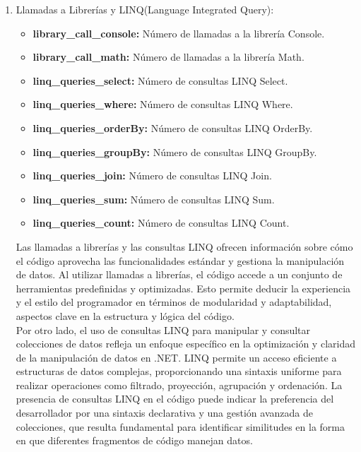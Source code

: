 \begin{enumerate}
    \item Llamadas a Librerías y LINQ(Language Integrated Query):
    \begin{itemize}
        \item {\bf library\_call\_console:} Número de llamadas a la librería Console.
        \item {\bf library\_call\_math:} Número de llamadas a la librería Math.
        \item {\bf linq\_queries\_select:} Número de consultas LINQ Select.
        \item {\bf linq\_queries\_where:} Número de consultas LINQ Where.
        \item {\bf linq\_queries\_orderBy:} Número de consultas LINQ OrderBy.
        \item {\bf linq\_queries\_groupBy:} Número de consultas LINQ GroupBy.
        \item {\bf linq\_queries\_join:} Número de consultas LINQ Join.
        \item {\bf linq\_queries\_sum:} Número de consultas LINQ Sum.
        \item {\bf linq\_queries\_count:} Número de consultas LINQ Count.
    \end{itemize}
    
    Las llamadas a librerías y las consultas LINQ ofrecen información sobre cómo el código aprovecha las funcionalidades estándar y gestiona la manipulación de datos. Al utilizar llamadas a librerías, el código accede a un conjunto de herramientas predefinidas y optimizadas. Esto permite deducir la experiencia y el estilo del programador en términos de modularidad y adaptabilidad, aspectos clave en la estructura y lógica del código.\\

Por otro lado, el uso de consultas LINQ para manipular y consultar colecciones de datos refleja un enfoque específico en la optimización y claridad de la manipulación de datos en .NET. LINQ permite un acceso eficiente a estructuras de datos complejas, proporcionando una sintaxis uniforme para realizar operaciones como filtrado, proyección, agrupación y ordenación. La presencia de consultas LINQ en el código puede indicar la preferencia del desarrollador por una sintaxis declarativa y una gestión avanzada de colecciones, que resulta fundamental para identificar similitudes en la forma en que diferentes fragmentos de código manejan datos.


\end{enumerate}
